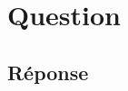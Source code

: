 \documentclass[12pt, report]{article}
\begin{document}
\section{Question}

\subsection*{Réponse}
\end{document}
